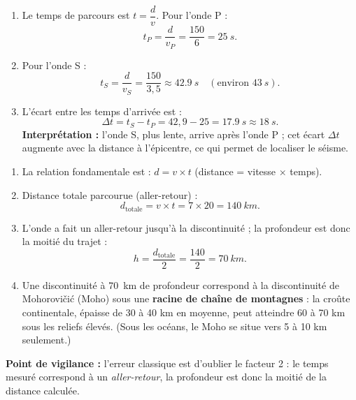 \documentclass[11pt]{article}
\newcommand{\cle}[1]{{\popxbold\color{popdark}#1}}
\begin{document}
\begin{corrige}
\begin{enumerate}
\item Le temps de parcours est $t = \dfrac{d}{v}$. Pour l'onde P :
\[ t_P = \frac{d}{v_P} = \frac{150}{6} = \SI{25}{s}. \]
\item Pour l'onde S :
\[ t_S = \frac{d}{v_S} = \frac{150}{3{,}5} \approx \SI{42,9}{s} \quad (\text{environ } \SI{43}{s}). \]
\item L'écart entre les temps d'arrivée est :
\[ \Delta t = t_S - t_P = 42{,}9 - 25 = \SI{17,9}{s} \approx \SI{18}{s}. \]
\textbf{Interprétation :} l'onde S, plus lente, arrive après l'onde P ; cet écart $\Delta t$ augmente avec la distance à l'épicentre, ce qui permet de localiser le séisme.
\end{enumerate}
\end{corrige}

\begin{corrige}
\begin{enumerate}
\item La relation fondamentale est : $d = v \times t$ (distance = vitesse $\times$ temps).
\item Distance totale parcourue (aller-retour) :
\[ d_{\text{totale}} = v \times t = 7 \times 20 = \SI{140}{km}. \]
\item L'onde a fait un aller-retour jusqu'à la discontinuité ; la profondeur est donc la moitié du trajet :
\[ h = \frac{d_{\text{totale}}}{2} = \frac{140}{2} = \SI{70}{km}. \]
\item Une discontinuité à \SI{70}{km} de profondeur correspond à la \cle{discontinuité de Mohorovičić} (Moho) sous une \textbf{racine de chaîne de montagnes} : la croûte continentale, épaisse de 30 à 40 km en moyenne, peut atteindre 60 à 70 km sous les reliefs élevés. (Sous les océans, le Moho se situe vers 5 à 10 km seulement.)
\end{enumerate}
\textbf{Point de vigilance :} l'erreur classique est d'oublier le facteur 2 : le temps mesuré correspond à un \emph{aller-retour}, la profondeur est donc la moitié de la distance calculée.
\end{corrige}
\end{document}
